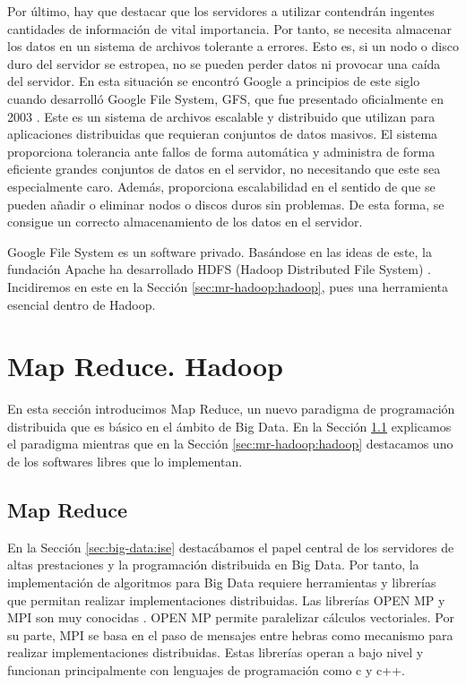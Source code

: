 \documentclass[10pt]{article}
\begin{document}
		Por último, hay que destacar que los servidores a utilizar contendrán ingentes cantidades de información de vital importancia. Por tanto, se necesita almacenar los datos en un sistema de archivos tolerante a errores. Esto es, si un nodo o disco duro del servidor se estropea, no se pueden perder datos ni provocar una caída del servidor. En esta situación se encontró Google a principios de este siglo cuando desarrolló Google File System, GFS, que fue presentado oficialmente en 2003 \cite{gfs}. Este es un sistema de archivos escalable y distribuido que utilizan para aplicaciones distribuidas que requieran conjuntos de datos masivos. El sistema proporciona tolerancia ante fallos de forma automática y administra de forma eficiente grandes conjuntos de datos en el servidor, no necesitando que este sea especialmente caro. Además, proporciona escalabilidad en el sentido de que se pueden añadir o eliminar nodos o discos duros sin problemas. De esta forma, se consigue un correcto almacenamiento de los datos en el servidor.
				
		Google File System es un software privado. Basándose en las ideas de este, la fundación Apache ha desarrollado HDFS (Hadoop Distributed File System) \cite{hdfs}. Incidiremos en este en la Sección \ref{sec:mr-hadoop:hadoop}, pues una herramienta esencial dentro de Hadoop.
				
	

\section{Map Reduce. Hadoop} \label{sec:mr-hadoop}

	En esta sección introducimos Map Reduce, un nuevo paradigma de programación distribuida que es básico en el ámbito de Big Data. En la Sección \ref{sec:mr-hadoop:map-reduce} explicamos el paradigma mientras que en la Sección \ref{sec:mr-hadoop:hadoop} destacamos uno de los softwares libres que lo implementan.

	\subsection{Map Reduce} \label{sec:mr-hadoop:map-reduce}

		En la Sección \ref{sec:big-data:ise} destacábamos el papel central de los servidores de altas prestaciones y la programación distribuida en Big Data. Por tanto, la implementación de algoritmos para Big Data requiere herramientas y librerías que permitan realizar implementaciones distribuidas. Las librerías OPEN MP y MPI son muy conocidas \cite{openmpmpi, openmp}. OPEN MP permite paralelizar cálculos vectoriales. Por su parte, MPI se basa en el paso de mensajes entre hebras como mecanismo para realizar implementaciones distribuidas. Estas librerías operan a bajo nivel y funcionan principalmente con lenguajes de programación como c y c++. 
		
\end{document}
